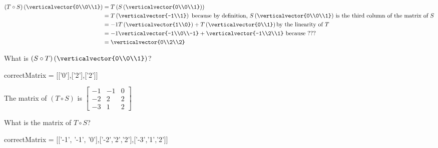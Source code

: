 \documentclass{ximera}
\begin{document}
\begin{question}
\begin{solution}
\begin{hint}
\begin{question}
	\end{question}
	\begin{question}
		\begin{solution}
		\begin{hint}
			\begin{align*}
				(T \circ S)\left(\verticalvector{0\\0\\1}\right) &= T\left(S\left(\verticalvector{0\\0\\1}\right)\right)\\
				&= T\left(\verticalvector{-1\\1}\right) \text{ because by definition, $S\left(\verticalvector{0\\0\\1}\right)$ is the third column of the matrix of $S$}\\
				&=-1T\left(\verticalvector{1\\0}\right) + T\left(\verticalvector{0\\1}\right) \text{by the linearity of $T$}\\
				&=-1\verticalvector{-1\\0\\-1}+\verticalvector{-1\\2\\1} \text{ because ???}\\
				&=\verticalvector{0\\2\\2}
			\end{align*}
		\end{hint}
		What is  $(S \circ T)\left(\verticalvector{0\\0\\1}\right)$?
			\begin{matrix-answer}[name=M]
 			   correctMatrix = [['0'],['2'],['2']]
 			 \end{matrix-answer}
		\end{solution}
		
	\end{question}
	
	
\end{hint}
\begin{hint}
	The matrix of $(T \circ S)$ is $\begin{bmatrix} -1 & -1 & 0\\-2 & 2&2\\-3&1&2 \end{bmatrix}$
\end{hint}
  What is the matrix of $T \circ S$?

  \begin{matrix-answer}[name=M]
    correctMatrix = [['-1', '-1', '0'],['-2','2','2'],['-3','1','2']]
  \end{matrix-answer}
\end{solution}

\end{question}
	
\end{document}
